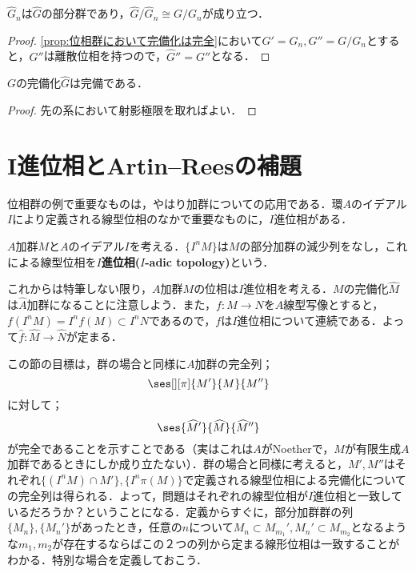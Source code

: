 \begin{cor}\label{cor:完備化しても商は同型}
	$\widehat{G}_n$は$\widehat{G}$の部分群であり，$\widehat{G}/\widehat{G}_n\cong G/G_n$が成り立つ．
\end{cor}

\begin{proof}
	\ref{prop:位相群において完備化は完全}において$G'=G_n,G''=G/G_n$とすると，$G''$は離散位相を持つので，$\widehat{G}''=G''$となる．
\end{proof}

\begin{cor}
	$G$の完備化$\widehat{G}$は完備である．
\end{cor}

\begin{proof}
	先の系において射影極限を取ればよい．
\end{proof}

\section{I進位相とArtin--Reesの補題}

位相群の例で重要なものは，やはり加群についての応用である．環$A$のイデアル$I$により定義される線型位相のなかで重要なものに，$I$進位相がある．

\begin{defi}[$I$進位相]
	$A$加群$M$と$A$のイデアル$I$を考える．$\{I^nM\}$は$M$の部分加群の減少列をなし，これによる線型位相を$I$\textbf{進位相($I$-adic topology)}という．
\end{defi}

これからは特筆しない限り，$A$加群$M$の位相は$I$進位相を考える．$M$の完備化$\widehat{M}$は$\widehat{A}$加群になることに注意しよう．また，$f:M\to N$を$A$線型写像とすると，$f(I^nM)=I^nf(M)\subset I^nN$であるので，$f$は$I$進位相について連続である．よって$\widehat{f}:\widehat{M}\to\widehat{N}$が定まる．

この節の目標は，群の場合と同様に$A$加群の完全列；
\[\ses[][\pi]{M'}{M}{M''}\]
に対して；
\[\ses{\widehat{M}'}{\widehat{M}}{\widehat{M}''}\]
が完全であることを示すことである（実はこれは$A$がNoetherで，$M$が有限生成$A$加群であるときにしか成り立たない）．群の場合と同様に考えると，$M',M''$はそれぞれ$\{(I^nM)\cap M'\},\{I^n \pi(M)\}$で定義される線型位相による完備化についての完全列は得られる．よって，問題はそれぞれの線型位相が$I$進位相と一致しているだろうか？ということになる．定義からすぐに，部分加群群の列$\{M_n\},\{M_n'\}$があったとき，任意の$n$について$M_n\subset M_{m_1}',M_n'\subset M_{m_2}$となるような$m_1,m_2$が存在するならばこの２つの列から定まる線形位相は一致することがわかる．特別な場合を定義しておこう．

